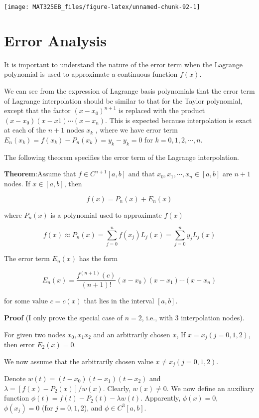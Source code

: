 \documentclass[
]{book}
\begin{document}
\begin{center}\texttt{[image: MAT325EB\_files/figure-latex/unnamed-chunk-92-1]} \end{center}

\hypertarget{error-analysis-5}{%
\section{Error Analysis}\label{error-analysis-5}}

It is important to understand the nature of the error term when the Lagrange polynomial is used to approximate a continuous function \(f(x)\).

We can see from the expression of Lagrange basis polynomials that the error term of Lagrange interpolation should be similar to that for the Taylor polynomial, except that the factor \((x - x_0)^{n+1}\) is replaced with the product \((x - x_0)(x - x1) \cdots (x - x_n)\). This is expected because interpolation is exact at each of the \(n + 1\) nodes \(x_k\) , where we have error term \(E_n (x_k) = f(x_k) - P_n (x_k) = y_k - y_k = 0\) for \(k = 0, 1, 2, \cdots , n\).

The following theorem specifies the error term of the Lagrange interpolation.

\textbf{Theorem}:Assume that \(f \in C^{n+1}[a, b]\) and that \(x_0, x_1, \cdots , x_n \in [a, b]\) are \(n + 1\) nodes. If \(x \in [a, b]\), then

\[
f(x) = P_n(x) + E_n(x)
\]

where \(P_n(x)\) is a polynomial used to approximate \(f(x)\)

\[
f(x) \approx P_n(x) = \sum_{j=0}^n f(x_j)L_j(x) = \sum_{j=0}^n y_jL_j(x)
\]

The error term \(E_n(x)\) has the form

\[
E_n(x) = \frac{f^{(n+1)}(c)}{(n+1)!}(x-x_0)(x-x_1)\cdots(x-x_n)
\]

for some value \(c = c(x)\) that lies in the interval \([a, b]\).

\textbf{Proof} (I only prove the special case of \(n = 2\), i.e., with 3 interpolation nodes).

For given two nodes \(x_0, x_1 x_2\) and an arbitrarily chosen \(x\), If \(x = x_j (j = 0, 1, 2)\), then error \(E_2(x) = 0\).

We now assume that the arbitrarily chosen value \(x \ne x_j (j =0, 1, 2)\).

Denote \(w(t) = (t - x_0)(t - x_1)(t - x_2)\) and \(\lambda = [f(x) - P_2(x)]/w(x)\). Clearly, \(w(x) \ne 0\). We now define an auxiliary function \(\phi(t) = f(t) - P_2(t) - \lambda w(t)\). Apparently, \(\phi(x) = 0\), \(\phi(x_j) = 0\) (for \(j = 0, 1,2\)), and \(\phi \in C^3[a, b]\).
\end{document}
